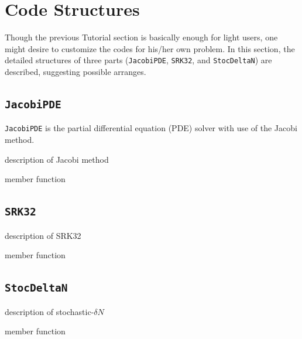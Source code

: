 \documentclass[aps, prd
, preprint
, nofootinbib 
, notitlepage
, superscriptaddress
, longbibliography
]{revtex4-1}
\begin{document}
\section{Code Structures}

Though the previous Tutorial section is basically enough for light users, one might desire to customize the codes for his/her own problem.
In this section, the detailed structures of three parts (\texttt{JacobiPDE}, \texttt{SRK32}, and \texttt{StocDeltaN}) are described, suggesting possible arranges.


\subsection{\texttt{JacobiPDE}}

\texttt{JacobiPDE} is the partial differential equation (PDE) solver with use of the Jacobi method.

description of Jacobi method

member function



\subsection{\texttt{SRK32}}

description of SRK32

member function


\subsection{\texttt{StocDeltaN}}\label{sec: StocDeltaN}

description of stochastic-$\delta N$

member function
















\end{document}
